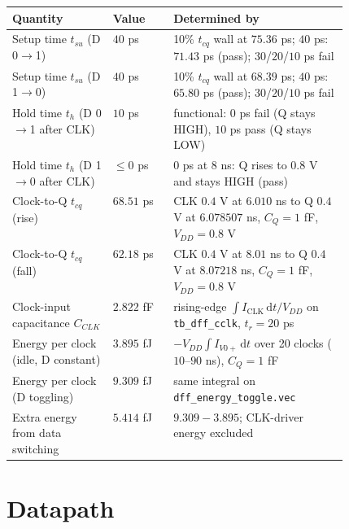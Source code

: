 \documentclass[10pt,letterpaper]{article}
\newcommand{\secbreak}{\Needspace{0.36\textheight}}
\newcommand{\code}[1]{\texttt{#1}}
\begin{document}
\begin{center}\small\begin{tabularx}{\linewidth}{@{}P{0.30\linewidth}P{0.18\linewidth}L@{}}\toprule Quantity & Value & Determined by\\\midrule
Setup time $t_{su}$ (D 0$\to$1) & $40$ ps & 10\% $t_{cq}$ wall at $75.36$ ps; $40$ ps: $71.43$ ps (pass); $30$/$20$/$10$ ps fail\\\addlinespace
Setup time $t_{su}$ (D 1$\to$0) & $40$ ps & 10\% $t_{cq}$ wall at $68.39$ ps; $40$ ps: $65.80$ ps (pass); $30$/$20$/$10$ ps fail\\\addlinespace
Hold time $t_{h}$ (D 0$\to$1 after CLK) & $10$ ps & functional: $0$ ps fail (Q stays HIGH), $10$ ps pass (Q stays LOW)\\\addlinespace
Hold time $t_{h}$ (D 1$\to$0 after CLK) & $\le0$ ps & $0$ ps at $8$ ns: Q rises to $0.8$ V and stays HIGH (pass)\\\addlinespace
Clock-to-Q $t_{cq}$ (rise) & $68.51$ ps & CLK $0.4$ V at $6.010$ ns to Q $0.4$ V at $6.078507$ ns, $C_Q=1$ fF, $V_{DD}=0.8$ V\\\addlinespace
Clock-to-Q $t_{cq}$ (fall) & $62.18$ ps & CLK $0.4$ V at $8.01$ ns to Q $0.4$ V at $8.07218$ ns, $C_Q=1$ fF, $V_{DD}=0.8$ V\\\addlinespace
Clock-input capacitance $C_{CLK}$ & $2.822$ fF & rising-edge $\int I_{\mathrm{CLK}}\,\mathrm{d}t/V_{DD}$ on \code{tb\_dff\_cclk}, $t_r=20$ ps\\\addlinespace
Energy per clock (idle, D constant) & $3.895$ fJ & $-V_{DD}\int I_{V0+}\,\mathrm{d}t$ over 20 clocks ($10$--$90$ ns), $C_Q=1$ fF\\\addlinespace
Energy per clock (D toggling) & $9.309$ fJ & same integral on \code{dff\_energy\_toggle.vec}\\\addlinespace
Extra energy from data switching & $5.414$ fJ & $9.309-3.895$; CLK-driver energy excluded\\\bottomrule\end{tabularx}\end{center}

\secbreak
\section{Datapath}\label{sec:datapath}
\end{document}
